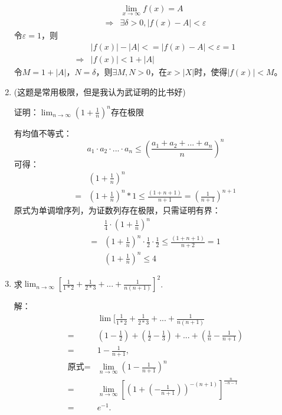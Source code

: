 \documentclass[UTF8]{ctexart}
\begin{document}
\begin{enumerate}
			\begin{equation}
				\begin{split}
					&\lim _{x\rightarrow \infty} f(x)=A \\
					\Rightarrow 
					&\exists \delta>0,|f(x)-A|<\varepsilon
				\end{split}
			\end{equation}
		令$\varepsilon=1$，则
			\begin{equation}
				\begin{split}
					&|f(x)|-|A|<=|f(x)-A|<\varepsilon=1\\
					\Rightarrow
					&|f(x)|<1+|A|
				\end{split}
			\end{equation}
			令$M=1+|A|$，$N=\delta$，则$\exists M,N>0$，在$x>|X|$时，使得$|f(x)|<M$。
			
			\item  (这题是常用极限，但是我认为武证明的比书好)
			
			证明：$\lim_{n\rightarrow \infty}(1+\frac{1}{n})^{n}$存在极限
			
			有均值不等式：
			$$
			a_1\cdot a_2\cdot...\cdot a_n \leq (
			\frac{a_1+a_2+...+a_n}{n})^n
			$$
			可得：
			\begin{equation}
				\begin{split}
					&(1+\frac{1}{n})^n \\
					=&(1+\frac{1}{n})^n*1 
					\leq\frac{(1+n+1)}{n+1}
					=(\frac{1}{n+1})^{n+1}
				\end{split}
			\end{equation}
			原式为单调增序列，为证数列存在极限，只需证明有界：
			\begin{equation}
				\begin{split}
					&\frac{1}{4}\cdot(1+\frac{1}{n})^n \\
					=&(1+\frac{1}{n})^n\cdot \frac{1}{2} \cdot \frac{1}{2}
					\leq\frac{(1+n+1)}{n+2}
					=1\\
					&(1+\frac{1}{n})^n\leq 4
				\end{split}
			\end{equation}
		
			\item 求$\lim_{n\rightarrow \infty} [\frac{1}{1*2}+\frac{1}{2*3}+...+\frac{1}{n(n+1)}]^2$.
			
			解：
			\begin{equation}
				\begin{split}
					&\lim [\frac{1}{1*2}+\frac{1}{2*3}+...+\frac{1}{n(n+1)}\\
					=&(1-\frac{1}{2})+(\frac{1}{2}-\frac{1}{3})+...+
					(\frac{1}{n}-\frac{1}{n+1})\\
					=&1-\frac{1}{n+1}, \\										
					\text{原式}=&\lim_{n\rightarrow \infty} (1-\frac{1}{n+1})^n \\
					=&\lim_{n\rightarrow \infty} [(1+(-\frac{1}{n+1}))^{-(n+1)}]
					^\frac{n}{-n-1} \\
					=&e^{-1}.
				\end{split}
			\end{equation}
		\end{enumerate}
\end{document}
